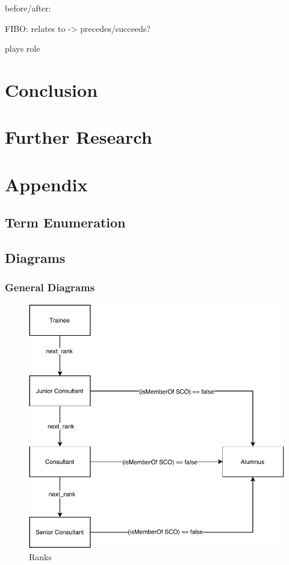 \documentclass[a4paper, DIV=13, BCOR=0cm]{scrbook}
\begin{document}
before/after:
\begin{compactitem}
	\item FIBO: relates to -> precedes/succeeds?
	\item plays role
\end{compactitem}


\chapter{Conclusion}
\chapter{Further Research}

\appendix
\chapter{Appendix}
\section{Term Enumeration}
\label{word-cloud}

\newpage
\section{Diagrams}
\subsection{General Diagrams}

\begin{figure}[h]
	\caption{Ranks}
	\centering
	\includegraphics[width=1\textwidth]{Diagrams/ranks.pdf}
\end{figure}
\end{document}
